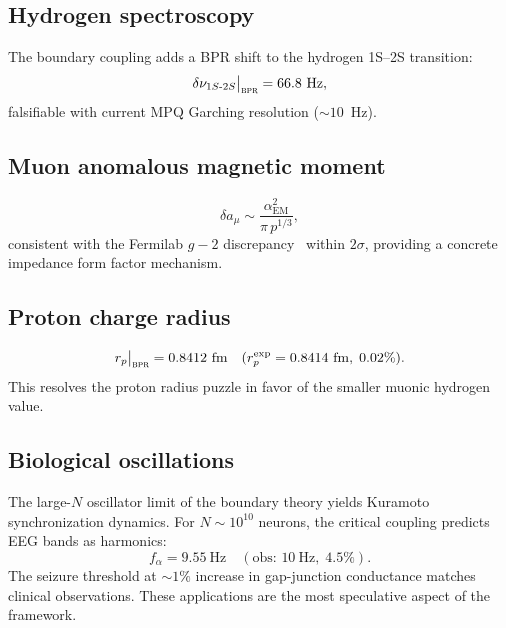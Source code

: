 \documentclass[aps,prd,twocolumn,superscriptaddress,longbibliography,nofootinbib]{revtex4-2}
\newcommand{\alphaEM}{\alpha_{\mathrm{EM}}}
\newcommand{\bpr}{\textsc{bpr}}
\begin{document}
\subsection{Hydrogen spectroscopy}

The boundary coupling adds a BPR shift to the hydrogen 1S--2S transition:
\begin{equation}
\delta\nu_{1S\text{-}2S}\big|_{\bpr} = 66.8~\text{Hz},
\label{eq:1s2s}
\end{equation}
falsifiable with current MPQ Garching resolution ($\sim 10$~Hz).

\subsection{Muon anomalous magnetic moment}

\begin{equation}
\delta a_\mu \sim \frac{\alphaEM^2}{\pi\, p^{1/3}},
\end{equation}
consistent with the Fermilab $g-2$ discrepancy~\cite{FermilabG2} within
$2\sigma$, providing a concrete impedance form factor mechanism.

\subsection{Proton charge radius}

\begin{equation}
r_p\big|_{\bpr} = 0.8412~\text{fm}
\quad (r_p^{\text{exp}} = 0.8414~\text{fm},\; 0.02\%).
\end{equation}
This resolves the proton radius puzzle in favor of the smaller muonic
hydrogen value.

\subsection{Biological oscillations}

The large-$N$ oscillator limit of the boundary theory yields Kuramoto
synchronization dynamics.  For $N \sim 10^{10}$ neurons, the critical
coupling predicts EEG bands as harmonics:
\begin{equation}
f_\alpha = 9.55~\text{Hz} \quad (\text{obs: }10~\text{Hz},\; 4.5\%).
\end{equation}
The seizure threshold at $\sim 1\%$ increase in gap-junction conductance
matches clinical observations.  These applications are the most speculative
aspect of the framework.


\end{document}
